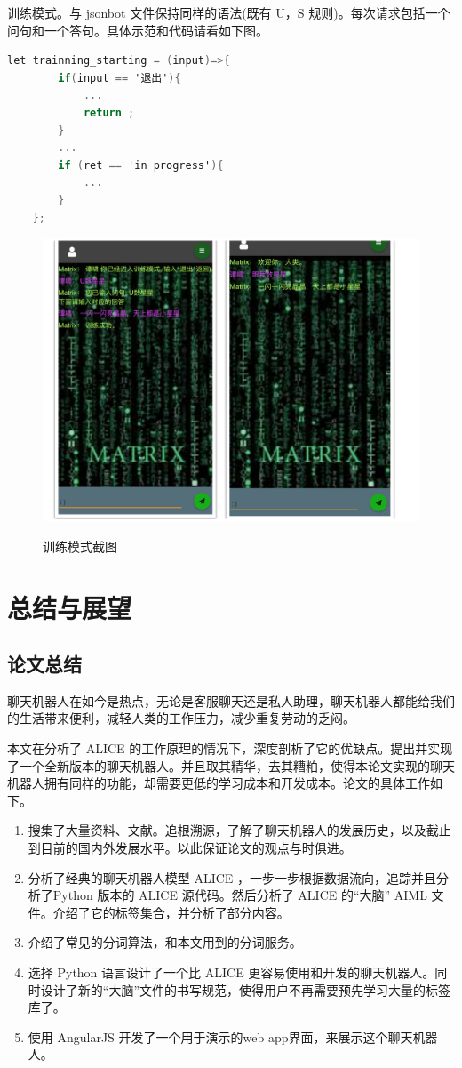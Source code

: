 \documentclass[bachelor,winfonts]{jnuthesis}
\begin{document}
训练模式。与 jsonbot 文件保持同样的语法(既有 U，S 规则)。每次请求包括一个问句和一个答句。具体示范和代码请看如下图。
\begin{lstlisting}[language=C]
let trainning_starting = (input)=>{
		if(input == '退出'){
            ...
			return ;
		}
		...
		if (ret == 'in progress'){
			...
		}
	};
\end{lstlisting}
\begin{figure}[H]
  \centering
  \includegraphics[width= 1.0\textwidth]{train.png}\\
  \caption{训练模式截图}\label{fig:pic9}
\end{figure}


\chapter{总结与展望}
\section{论文总结}

聊天机器人在如今是热点，无论是客服聊天还是私人助理，聊天机器人都能给我们的生活带来便利，减轻人类的工作压力，减少重复劳动的乏闷。

本文在分析了 ALICE 的工作原理的情况下，深度剖析了它的优缺点。提出并实现了一个全新版本的聊天机器人。并且取其精华，去其糟粕，使得本论文实现的聊天机器人拥有同样的功能，却需要更低的学习成本和开发成本。论文的具体工作如下。

\begin{enumerate}
\item 搜集了大量资料、文献。追根溯源，了解了聊天机器人的发展历史，以及截止到目前的国内外发展水平。以此保证论文的观点与时俱进。
\item 分析了经典的聊天机器人模型 ALICE ，一步一步根据数据流向，追踪并且分析了Python 版本的 ALICE 源代码。然后分析了 ALICE 的“大脑” AIML 文件。介绍了它的标签集合，并分析了部分内容。
\item 介绍了常见的分词算法，和本文用到的分词服务。
\item 选择 Python 语言设计了一个比 ALICE 更容易使用和开发的聊天机器人。同时设计了新的“大脑”文件的书写规范，使得用户不再需要预先学习大量的标签库了。
\item 使用 AngularJS 开发了一个用于演示的web app界面，来展示这个聊天机器人。
\end{enumerate}
\end{document}
